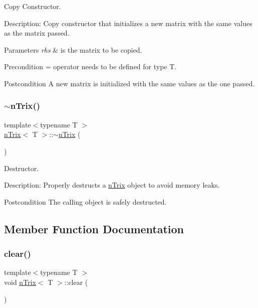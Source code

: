 Copy Constructor. 

Description\+: Copy constructor that initializes a new matrix with the same values as the matrix passed. 
\begin{DoxyParams}{Parameters}
{\em rhs} & is the matrix to be copied. \\
\hline
\end{DoxyParams}
\begin{DoxyPrecond}{Precondition}
= operator needs to be defined for type T. 
\end{DoxyPrecond}
\begin{DoxyPostcond}{Postcondition}
A new matrix is initialized with the same values as the one passed. 
\end{DoxyPostcond}
\mbox{\label{classnTrix_a9f0136573e29a5196bee15e35983e1f8}} 
\subsubsection{\texorpdfstring{$\sim$n\+Trix()}{~nTrix()}}
{\footnotesize\ttfamily template$<$typename T $>$ \\
\hyperlink{classnTrix}{n\+Trix}$<$ T $>$\+::$\sim$\hyperlink{classnTrix}{n\+Trix} (\begin{DoxyParamCaption}{ }\end{DoxyParamCaption})}



Destructor. 

Description\+: Properly destructs a \hyperlink{classnTrix}{n\+Trix} object to avoid memory leaks. \begin{DoxyPostcond}{Postcondition}
The calling object is safely destructed. 
\end{DoxyPostcond}


\subsection{Member Function Documentation}
\mbox{\label{classnTrix_a709740bd4cf9fe868849e6e3de8189f2}} 
\subsubsection{\texorpdfstring{clear()}{clear()}}
{\footnotesize\ttfamily template$<$typename T $>$ \\
void \hyperlink{classnTrix}{n\+Trix}$<$ T $>$\+::clear (\begin{DoxyParamCaption}{ }\end{DoxyParamCaption})}



